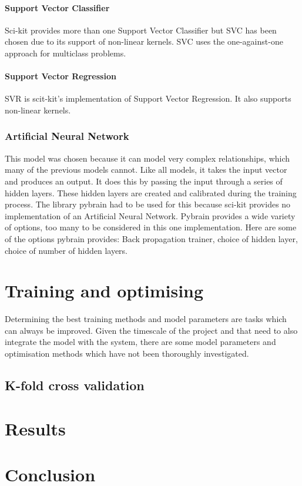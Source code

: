 \paragraph{Support Vector Classifier}
Sci-kit provides more than one Support Vector Classifier but SVC has been chosen due to its support of non-linear kernels. SVC uses the one-against-one approach for multiclass problems.

\paragraph{Support Vector Regression}
SVR is scit-kit's implementation of Support Vector Regression. It also supports non-linear kernels.

\subsubsection{Artificial Neural Network}
This model was chosen because it can model very complex relationships, which many of the previous models cannot. Like all models, it takes the input vector and produces an output. It does this by passing the input through a series of hidden layers. These hidden layers are created and calibrated during the training process. The library pybrain had to be used for this because sci-kit provides no implementation of an Artificial Neural Network.
Pybrain provides a wide variety of options, too many to be considered in this one implementation. Here are some of the options pybrain provides: Back propagation trainer, choice of hidden layer, choice of number of hidden layers.

\section{Training and optimising}
Determining the best training methods and model parameters are tasks which can always be improved. Given the timescale of the project and that need to also integrate the model with the system, there are some model parameters and optimisation methods which have not been thoroughly investigated.

\subsection{K-fold cross validation}

\section{Results}

\section{Conclusion}

